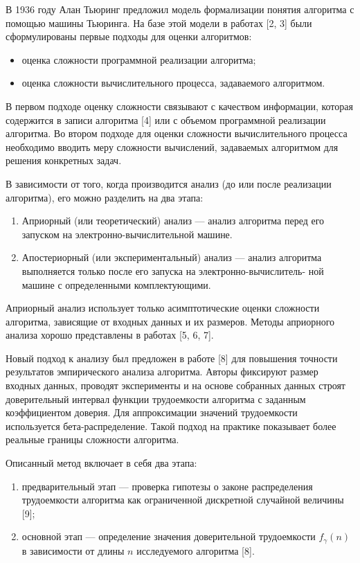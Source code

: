 
В 1936 году Алан Тьюринг предложил модель формализации понятия алгоритма с помощью машины Тьюринга. На базе этой модели в работах [2, 3] были сформулированы первые подходы для оценки алгоритмов:
\begin{itemize}
\item оценка сложности программной реализации алгоритма;
\item оценка сложности вычислительного процесса, задаваемого алгоритмом.
\end{itemize}

В первом подходе оценку сложности связывают с качеством информации, которая содержится в записи алгоритма [4] или с объемом программной реализации алгоритма.
Во втором подходе для оценки сложности вычислительного процесса необходимо вводить меру сложности вычислений, задаваемых алгоритмом для решения конкретных задач. 

В зависимости от того, когда производится анализ (до или после реализации алгоритма), его можно разделить на два этапа:
\begin{enumerate}
\item Априорный (или теоретический) анализ — анализ алгоритма перед
его запуском на электронно-вычислительной машине.
\item Апостериорный (или экспериментальный) анализ — анализ алгоритма выполняется только после его запуска на электронно-вычислитель-
ной машине с определенными комплектующими.
\end{enumerate}

Априорный анализ использует только асимптотические оценки сложности алгоритма, зависящие от входных данных и их размеров. Методы априорного анализа хорошо представлены в работах [5, 6, 7].

Новый подход к анализу был предложен в работе [8] для повышения точности результатов эмпирического анализа алгоритма. Авторы фиксируют размер входных данных, проводят эксперименты и на основе собранных данных строят доверительный интервал функции трудоемкости алгоритма с заданным коэффициентом доверия. Для аппроксимации значений трудоемкости используется бета-распределение. Такой подход на практике показывает более реальные границы сложности алгоритма.

Описанный метод включает в себя два этапа:
\begin{enumerate}
\item предварительный этап — проверка гипотезы о законе распределения
трудоемкости алгоритма как ограниченной дискретной случайной величины [9];
\item основной этап — определение значения доверительной трудоемкости $f_{\gamma}(n)$ в зависимости от длины $n$ исследуемого алгоритма [8].
\end{enumerate}

